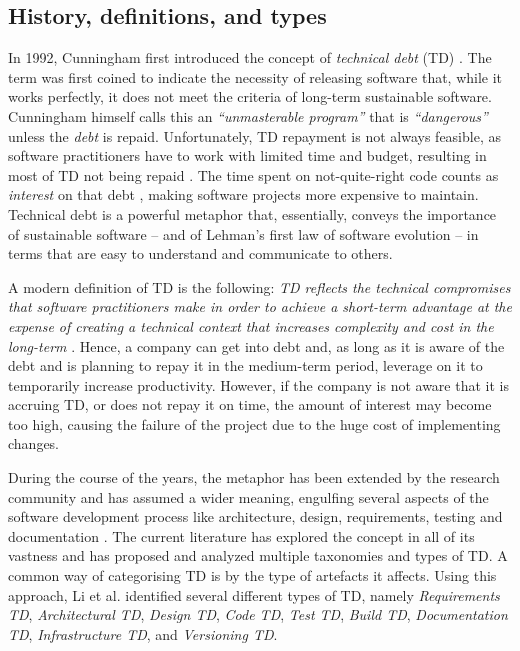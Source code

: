 \subsection{History, definitions, and types}
In 1992, Cunningham first introduced the concept of \emph{technical debt} (TD) \cite{Cunningham1992}. 
The term was first coined to indicate the necessity of releasing software that, while it works perfectly, it does not meet the criteria of long-term sustainable software. 
Cunningham himself calls this an \emph{``unmasterable program''} that is \emph{``dangerous''} unless the \emph{debt} is repaid.
Unfortunately, TD repayment is not always feasible, as software practitioners have to work with limited time and budget, resulting in most of TD not being repaid \cite{Digkas2018}.
The time spent on not-quite-right code counts as \emph{interest} on that debt \cite{Cunningham1992}, making software projects more expensive to maintain.
Technical debt is a powerful metaphor that, essentially, conveys the importance of sustainable software -- and of Lehman's first law of software evolution -- in terms that are easy to understand and communicate to others. 

A modern definition of TD is the following: \emph{TD reflects the technical compromises that software practitioners make in order to achieve a short-term advantage at the expense of creating a technical context that increases complexity and cost in the long-term} \cite{Avgeriou2016}. 
Hence, a company can get into debt and, as long as it is aware of the debt and is planning to repay it in the medium-term period, leverage on it to temporarily increase productivity.
However, if the company is not aware that it is accruing TD, or does not repay it on time, the amount of interest may become too high, causing the failure of the project due to the huge cost of implementing changes.

During the course of the years, the metaphor has been extended by the research community and has assumed a wider meaning, engulfing several aspects of the software development process like architecture, design, requirements, testing and documentation \cite{Brown2010}.
The current literature has explored the concept in all of its vastness and has proposed and analyzed multiple taxonomies and types of TD.
A common way of categorising TD is by the type of artefacts it affects. Using this approach, Li et al. \cite{Li2015} identified several different types of TD, namely \emph{Requirements TD}, \emph{Architectural TD}, \emph{Design TD}, \emph{Code TD}, \emph{Test TD}, \emph{Build TD}, \emph{Documentation TD}, \emph{Infrastructure TD}, and \emph{Versioning TD}.

